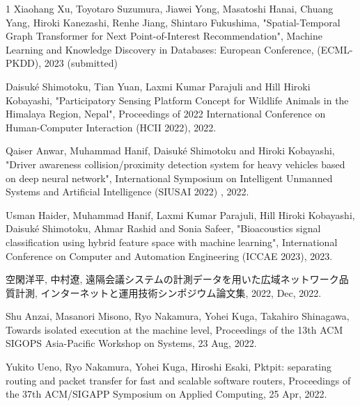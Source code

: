 \begin{査読付}{1}
Xiaohang Xu, Toyotaro Suzumura, Jiawei Yong, Masatoshi Hanai, Chuang Yang, Hiroki Kanezashi, Renhe Jiang, Shintaro Fukushima, "Spatial-Temporal Graph Transformer for Next Point-of-Interest Recommendation", Machine Learning and Knowledge Discovery in Databases: European Conference, (ECML-PKDD), 2023 (submitted)

Daisuk\'e Shimotoku, Tian Yuan, Laxmi Kumar Parajuli and Hill Hiroki Kobayashi, "Participatory Sensing Platform Concept for Wildlife Animals in the Himalaya Region, Nepal", Proceedings of 2022 International Conference on Human-Computer Interaction (HCII 2022), 2022.  

Qaiser Anwar, Muhammad Hanif, Daisuk\'e Shimotoku and  Hiroki Kobayashi, "Driver awareness collision/proximity detection system for heavy vehicles based on deep neural network", International Symposium on Intelligent Unmanned Systems and Artificial Intelligence (SIUSAI 2022) , 2022.  

Usman Haider, Muhammad Hanif, Laxmi Kumar Parajuli, Hill Hiroki Kobayashi, Daisuk\'e Shimotoku, Ahmar Rashid and Sonia Safeer, "Bioacoustics signal classification using hybrid feature space with machine learning",  International Conference on Computer and Automation Engineering (ICCAE 2023), 2023.  

空閑洋平, 中村遼, 遠隔会議システムの計測データを用いた広域ネットワーク品質計測, インターネットと運用技術シンポジウム論文集, 2022, Dec, 2022.

Shu Anzai, Masanori Misono, Ryo Nakamura, Yohei Kuga, Takahiro Shinagawa, Towards isolated execution at the machine level, Proceedings of the 13th ACM SIGOPS Asia-Pacific Workshop on Systems, 23 Aug, 2022.

Yukito Ueno, Ryo Nakamura, Yohei Kuga, Hiroshi Esaki, Pktpit: separating routing and packet transfer for fast and scalable software routers, Proceedings of the 37th ACM/SIGAPP Symposium on Applied Computing, 25 Apr, 2022.


\end{査読付}
